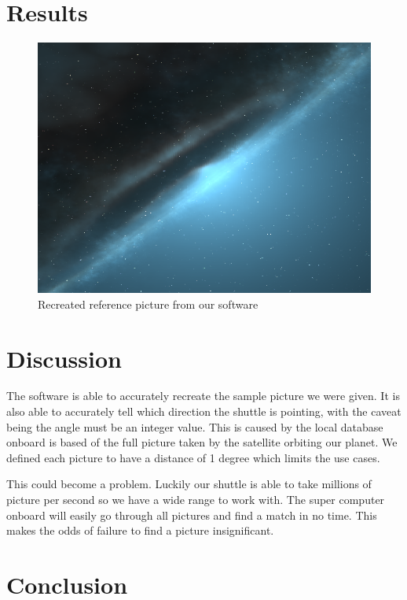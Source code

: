 \documentclass[reprint,english,notitlepage]{revtex4-2}
\begin{document}
\section{Results} \label{sec:results}

\begin{figure}[h!]
	\centering
	\includegraphics[scale = 0.2]{Test_Image.png}
	\caption{Recreated reference picture from our software %
	}
	\label{fig: ref picture}
  \end{figure}



\section{Discussion} \label{sec:discussion}
The software is able to accurately recreate the sample picture we were given. It is also able to accurately tell which direction the shuttle is pointing, with the caveat being the angle must be an integer value. This is caused by the local database onboard is based of the full picture taken by the satellite orbiting our planet. We defined each picture to have a distance of 1 degree which limits the use cases.

This could become a problem. Luckily our shuttle is able to take millions of picture per second so we have a wide range to work with. The super computer onboard will easily go through all pictures and find a match in no time. This makes the odds of failure to find a picture insignificant.   


\section{Conclusion} \label{sec:conclusion}
\end{document}
